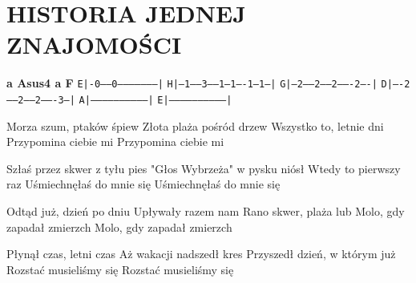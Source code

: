 \documentclass[../../../songbook.tex]{subfiles}
\begin{document}
\TabPositions{8cm} %
\section*{HISTORIA JEDNEJ ZNAJOMOŚCI}
{}
\vspace{0.5cm}
{\color{red}\textbf{a		Asus4	        a		    F} } \newline
 \texttt{E|-0------0--------------------|} \newline
 \texttt{H|--1------3-----1--1----1--1--|} \newline
 \texttt{G|---2------2-----2-------2----|} \newline
 \texttt{D|----2------2-----2-------3---|} \newline
 \texttt{A|-----------------------------|} \newline
 \texttt{E|-----------------------------|} \newline


Morza szum, ptaków śpiew	 \newline
Złota plaża pośród drzew	 \newline
Wszystko to, letnie dni		 \newline
Przypomina ciebie mi		 \newline
Przypomina ciebie mi		 \newline

Szłaś przez skwer z tyłu pies 		 \newline
"Głos Wybrzeża" w pysku niósł 		 \newline
Wtedy to pierwszy raz 		 \newline
Uśmiechnęłaś do mnie się 		 \newline
Uśmiechnęłaś do mnie się 		 \newline

Odtąd już, dzień po dniu 		 \newline
Upływały razem nam 		 \newline
Rano skwer, plaża lub 		 \newline
Molo, gdy zapadał zmierzch 		 \newline
Molo, gdy zapadał zmierzch 		 \newline

Płynął czas, letni czas 		 \newline
Aż wakacji nadszedł kres 		 \newline
Przyszedł dzień, w którym już 		 \newline
Rozstać musieliśmy się 		 \newline
Rozstać musieliśmy się 		 \newline
\end{document}
